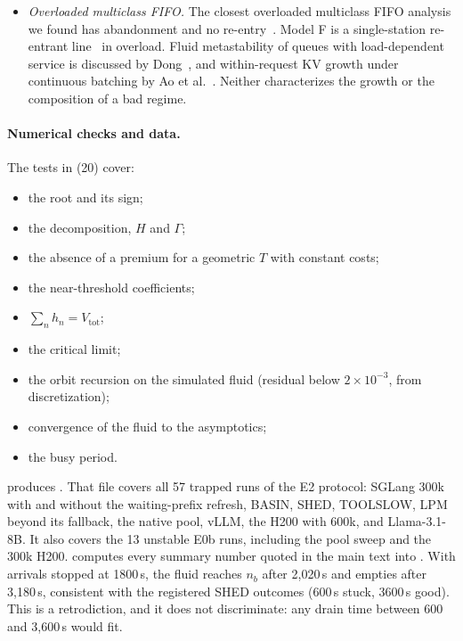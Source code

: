 \begin{itemize}[leftmargin=*,nosep]
remark that their result extends to a fixed fraction of the flow leaving at each node, which is a random~$T$. They prove
existence, and uniqueness in special cases, and leave non-steady trajectories open. Lemma~\ref{lem:orbit} and
Theorem~\ref{thm:trap} treat those for model~F: every trapped trajectory converges to the steady regime.
\item \emph{Overloaded multiclass FIFO.} The closest overloaded multiclass FIFO analysis we found has abandonment and no
re-entry~\citep{jennings2013fluid}. Model F is a single-station re-entrant line~\citep{kumar1993reentrant} in overload.
Fluid metastability of queues with load-dependent service is discussed by Dong~\citep{dong2022metastability}, and
within-request KV growth under continuous batching by Ao et al.~\citep{ao2026service}. Neither characterizes the growth or
the composition of a bad regime.
\end{itemize}

\paragraph{Numerical checks and data.} The tests in  (20) cover:
\begin{itemize}[leftmargin=*,nosep]
\item the root and its sign;
\item the decomposition, $H$ and $\Gamma$;
\item the absence of a premium for a geometric $T$ with constant costs;
\item the near-threshold coefficients;
\item $\sum_nh_n=V_{\mathrm{tot}}$;
\item the critical limit;
\item the orbit recursion on the simulated fluid (residual below $2\times10^{-3}$, from discretization);
\item convergence of the fluid to the asymptotics;
\item the busy period.
\end{itemize}
 produces . That file covers all 57 trapped
runs of the E2 protocol: SGLang 300k with and without the waiting-prefix refresh, BASIN, SHED, TOOLSLOW, LPM beyond its
fallback, the native pool, vLLM, the H200 with 600k, and Llama-3.1-8B. It also covers the 13 unstable E0b runs, including the
pool sweep and the 300k H200.  computes every summary number quoted in the main text
into . With arrivals stopped at 1800\,s, the fluid reaches $n_b$ after 2{,}020\,s and
empties after 3{,}180\,s, consistent with the registered SHED outcomes (600\,s stuck, 3600\,s good). This is a retrodiction,
and it does not discriminate: any drain time between 600 and 3{,}600\,s would fit.

